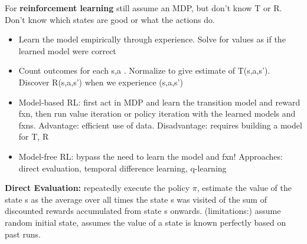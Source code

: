 \documentclass[10pt,twocolumn]{article}
\begin{document}
	For {\bf reinforcement learning} still assume an MDP, but don't know T or R. Don't know which states are good or what the actions do.
	\begin{itemize}
		\item Learn the model empirically through experience. Solve for values as if the learned model were correct
		\item Count outcomes for each s,a . Normalize to give estimate of T(s,a,s'). Discover R(s,a,s') when we experience (s,a,s')
		\item Model-based RL: first act in MDP and learn the transition model and reward fxn, then run value iteration or policy iteration with the learned models and fxns. Advantage: efficient use of data. Disadvantage: requires building a model for T, R
		\item Model-free RL: bypass the need to learn the model and fxn! Approaches: direct evaluation, temporal difference learning, q-learning
	\end{itemize}
	\textbf{Direct Evaluation: }repeatedly execute the policy $\pi$, estimate the value of the state s as the average over all times the state s was visited of the sum of discounted rewards accumulated from state s onwards. (limitations:) assume random initial state, assumes the value of a state is known perfectly based on past runs.
\end{document}
